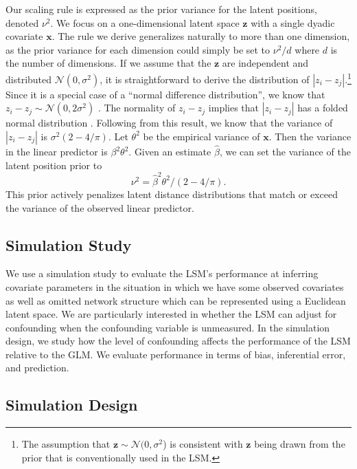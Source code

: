 \documentclass[11pt]{article}
\begin{document}
Our scaling rule is expressed as the prior variance for the latent positions, denoted $\nu^2$. We focus on a one-dimensional latent space $\mathbf{z}$ with a single dyadic covariate $\mathbf{x}$. The rule we derive generalizes naturally to more than one dimension, as the prior variance for each dimension could simply be set to $\nu^2/d$ where $d$ is the number of dimensions.  If we assume that the $\mathbf{z}$ are independent and distributed $\mathcal{N}(0,\sigma^2)$, it is straightforward to derive the distribution of $|z_i - z_j|$.\footnote{The assumption that $\mathbf{z} \sim \mathcal{N}(0,\sigma^2$) is consistent with $\mathbf{z}$ being drawn from the prior that is conventionally used in the LSM.} Since it is a special case of a ``normal difference distribution'', we know that $z_i - z_j \sim \mathcal{N}(0,2\sigma^2)$ \citep{devore2012}. The normality of $z_i - z_j$ implies that $|z_i - z_j|$ has a folded normal distribution \citep{leone1961}. Following from this result, we know that the variance of  $|z_i - z_j|$ is $\sigma^2(2-4/\pi)$.  Let $\theta^2$ be the empirical variance of $\mathbf{x}$. Then the variance in the linear predictor is $\beta^2\theta^2$. Given an estimate $\hat{\beta}$, we can set the variance of the latent position prior to $$\nu^2=\hat{\beta}^2\theta^2/(2-4/\pi).$$  This prior actively penalizes latent distance distributions that match or exceed the variance of the observed linear predictor. 
\subsection{Simulation Study}

We use a simulation study to evaluate the LSM's performance at inferring covariate parameters in the situation in which we have some observed covariates as well as omitted network structure which can be represented using a Euclidean latent space. We are particularly interested in whether the LSM can adjust for confounding when the confounding variable is unmeasured. In the simulation design, we study how the level of confounding affects the performance of the LSM relative to the GLM. We evaluate performance in terms of bias, inferential error, and prediction. 

\subsection{Simulation Design}
\end{document}
